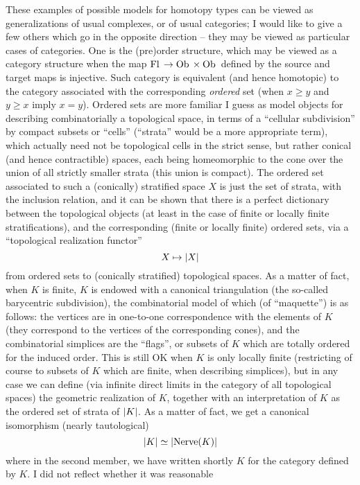 \label{sec:22}%
These examples of possible models for homotopy types can be viewed as
generalizations of usual complexes, or of usual categories; I would
like to give a few others which go in the opposite direction -- they
may be viewed as particular cases of categories. One is the (pre)order
structure, which may be viewed as a category structure when the map
$\operatorname{Fl}{} \to \operatorname{Ob}{} \times \operatorname{Ob}{}$ defined by the source and target maps
is injective. Such category is equivalent (and hence homotopic) to the
category associated with the corresponding \emph{ordered} set (when
$x\ge y$ and $y\ge x$ imply $x=y$). Ordered sets are more familiar I
guess as model objects for describing combinatorially a topological
space, in terms of a ``cellular subdivision'' by compact subsets or
``cells'' (``strata'' would be a more appropriate term),
which actually need not be topological cells in the strict sense, but
rather conical (and hence contractible) spaces, each being
homeomorphic to the cone over the union of all strictly smaller strata
(this union is compact). The ordered set associated to such a
(conically) stratified space $X$ is just the set of strata, with the
inclusion relation, and it can be shown that there is a perfect
dictionary between the topological objects (at least in the case of
finite or locally finite stratifications), and the corresponding
(finite or locally finite) ordered sets, via a ``topological
realization functor''
\[ X \mapsto \lvert X\rvert\]
from ordered sets to (conically stratified) topological spaces. As a
matter of fact, when $K$ is finite, $K$ is endowed with a canonical
triangulation (the so-called barycentric subdivision), the
combinatorial model of which (of ``maquette'') is as follows: the
vertices are in one-to-one correspondence with the elements of $K$
(they correspond to the vertices of the corresponding cones), and the
combinatorial simplices are the ``flags'', or subsets of $K$ which are
totally ordered for the induced order. This is still OK when $K$ is
only locally finite (restricting of course to subsets of $K$ which are
finite, when describing simplices), but in any case we can define (via
infinite direct limits in the category \Spaces of all topological
spaces) the geometric realization of $K$, together with an
interpretation of $K$ as the ordered set of strata of $\lvert K\rvert$. As a
matter of fact, we get a canonical isomorphism (nearly tautological)
\[ \lvert K\rvert \simeq \lvert\text{Nerve}(K)\rvert \]
where in the second member, we have written shortly $K$ for the
category defined by $K$. I did not reflect whether it was reasonable
